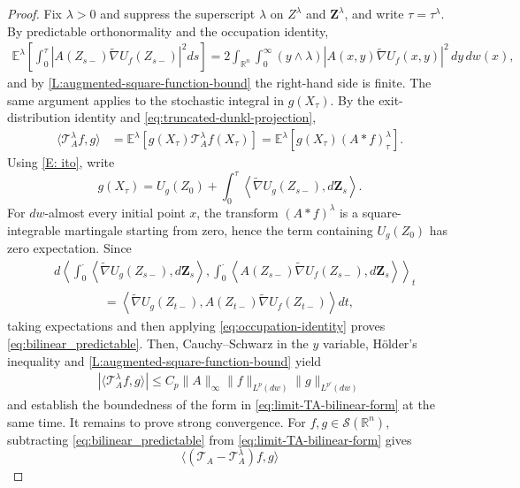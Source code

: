 \documentclass[11pt]{amsart}
\theoremstyle{definition}
\theoremstyle{remark}
\numberwithin{equation}{section}
\newcommand{\R}{\mathbb{R}}
\begin{document}
\begin{proof}
Fix $\lambda>0$ and suppress the superscript $\lambda$ on $Z^\lambda$ and $\mathbf Z^\lambda$, and write $\tau=\tau^\lambda$. By predictable orthonormality and the occupation identity,
\begin{align*}
\mathbb E^\lambda\left[
\int_0^\tau\left|A(Z_{s-})\widetilde\nabla U_f(Z_{s-})\right|^2ds
\right]
=
2\int_{\R^n}\int_0^\infty
(y\wedge\lambda)\left|A(x,y)\widetilde\nabla U_f(x,y)\right|^2
\,dy\,dw(x),
\end{align*}
and by \cref{L:augmented-square-function-bound} the right-hand side is finite.
The same argument applies to the stochastic integral in $g(X_\tau)$. By the exit-distribution identity and \eqref{eq:truncated-dunkl-projection},
\begin{align*}
\langle\mathcal T_A^\lambda f,g\rangle
&=
\mathbb E^\lambda\left[g(X_\tau)\mathcal T_A^\lambda f(X_\tau)\right]
=
\mathbb E^\lambda\left[g(X_\tau)(A\ast f)_\tau^\lambda\right].
\end{align*}
Using \eqref{E: ito}, write
\[
g(X_\tau)
=
U_g(Z_0)
+
\int_0^\tau\left\langle\widetilde\nabla U_g(Z_{s-}),d\mathbf Z_s\right\rangle.
\]
For $dw$-almost every initial point $x$, the transform $(A\ast f)^\lambda$ is a square-integrable martingale starting from zero, hence the term containing $U_g(Z_0)$ has zero expectation. Since
\begin{align*}
&d\left\langle
\int_0^\cdot\left\langle\widetilde\nabla U_g(Z_{s-}),d\mathbf Z_s\right\rangle,
\int_0^\cdot\left\langle A(Z_{s-})\widetilde\nabla U_f(Z_{s-}),d\mathbf Z_s\right\rangle
\right\rangle_t\\
&\hspace{4em}=
\left\langle\widetilde\nabla U_g(Z_{t-}),A(Z_{t-})\widetilde\nabla U_f(Z_{t-})\right\rangle dt,
\end{align*}
taking expectations and then applying \eqref{eq:occupation-identity} proves \eqref{eq:bilinear_predictable}. Then, Cauchy--Schwarz in the $y$ variable, H\"older's inequality and \cref{L:augmented-square-function-bound} yield
\begin{align*}
|\langle\mathcal T_A^\lambda f,g\rangle|
\leq C_p\|A\|_\infty\|f\|_{L^p(dw)}\|g\|_{L^{p'}(dw)}
\end{align*}
and establish the boundedness of the form in \eqref{eq:limit-TA-bilinear-form} at the same time. It remains to prove strong convergence. For $f,g\in\mathcal S(\R^n)$, subtracting \eqref{eq:bilinear_predictable} from \eqref{eq:limit-TA-bilinear-form} gives
\[
\langle(\mathcal T_A-\mathcal T_A^\lambda)f,g\rangle
\]
\end{proof}
\end{document}
